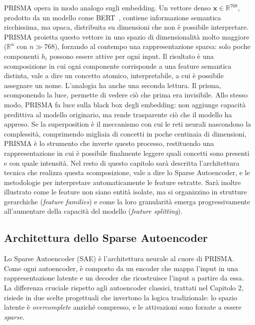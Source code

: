PRISMA opera in modo analogo sugli embedding. Un vettore denso $\mathbf{x} \in \mathbb{R}^{768}$, prodotto da un modello come BERT~\parencite{devlin2018bert}, contiene informazione semantica ricchissima, ma opaca, distribuita su dimensioni che non è possibile interpretare. PRISMA proietta questo vettore in uno spazio di dimensionalità molto maggiore ($\mathbb{R}^{n}$ con $n \gg 768$), forzando al contempo una rappresentazione sparsa: solo poche componenti $h_i$ possono essere attive per ogni input. Il risultato è una scomposizione in cui ogni componente corrisponde a una feature semantica distinta, vale a dire un concetto atomico, interpretabile, a cui è possibile assegnare un nome.
L'analogia ha anche una seconda lettura. Il prisma, scomponendo la luce, permette di vedere ciò che prima era invisibile. Allo stesso modo, PRISMA fa luce sulla black box degli embedding: non aggiunge capacità predittiva al modello originario, ma rende trasparente ciò che il modello ha appreso. Se la superposition è il meccanismo con cui le reti neurali nascondono la complessità, comprimendo migliaia di concetti in poche centinaia di dimensioni, PRISMA è lo strumento che inverte questo processo, restituendo una rappresentazione in cui è possibile finalmente leggere quali concetti sono presenti e con quale intensità.
Nel resto di questo capitolo sarà descritta l'architettura tecnica che realizza questa scomposizione, vale a dire lo Sparse Autoencoder, e le metodologie per interpretare automaticamente le feature estratte. Sarà inoltre illustrato come le feature non siano entità isolate, ma si organizzino in strutture gerarchiche (\textit{feature families}) e come la loro granularità emerga progressivamente all'aumentare della capacità del modello (\textit{feature splitting}).

\subsection{Architettura dello Sparse Autoencoder}
\label{subsec:sae_architecture}

Lo Sparse Autoencoder (SAE) è l'architettura neurale al cuore di PRISMA. Come ogni autoencoder, è composto da un encoder che mappa l'input in una rappresentazione latente e un decoder che ricostruisce l'input a partire da essa. La differenza cruciale rispetto agli autoencoder classici, trattati nel Capitolo 2, risiede in due scelte progettuali che invertono la logica tradizionale: lo spazio latente è \textit{overcomplete} anziché compresso, e le attivazioni sono forzate a essere \textit{sparse}.

